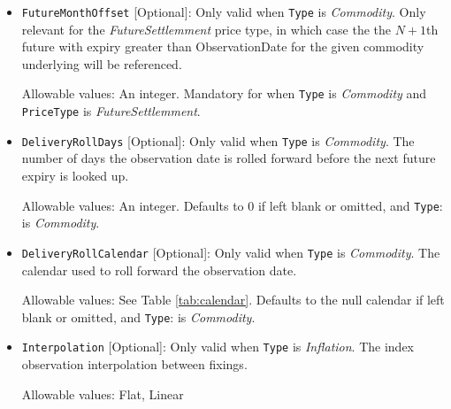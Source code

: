 \begin{itemize}
\item \lstinline!FutureMonthOffset! [Optional]:
Only valid when  \lstinline!Type! is  \emph{Commodity}. Only relevant for the \emph{FutureSettlemment} price type, in which case the the $N+1$th future with
  expiry greater than ObservationDate for the given commodity underlying will be referenced.

Allowable values:  An integer. Mandatory for when  \lstinline!Type! is  \emph{Commodity} and \lstinline!PriceType! is \emph{FutureSettlemment}.

\item \lstinline!DeliveryRollDays! [Optional]:
Only valid when  \lstinline!Type! is  \emph{Commodity}.  The number of days the observation date is rolled forward before the
  next future expiry is looked up.
  
Allowable values: An integer. Defaults to 0 if left blank or omitted, and \lstinline!Type!: is  \emph{Commodity}.

\item \lstinline!DeliveryRollCalendar! [Optional]:
Only valid when  \lstinline!Type! is  \emph{Commodity}.  The calendar used to roll forward the observation date.

Allowable values: See Table \ref{tab:calendar}. Defaults to the null calendar if left blank or omitted, and \lstinline!Type!: is  \emph{Commodity}.

\item \lstinline!Interpolation! [Optional]:
Only valid when \lstinline!Type! is  \emph{Inflation}. The index observation interpolation between fixings.

Allowable values: Flat, Linear

\end{itemize}
